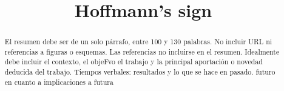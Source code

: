 \documentclass{bmcart}
\begin{document}
	\begin{frontmatter}
	
		\begin{fmbox}
			
			
			\title{Hoffmann's sign}
			
			
			\author[
			  addressref={aff1},                   %
			  corref={aff1},                       %
			  email={depablodiego@uma.es}   %
			]{ } %
			\author[
			  addressref={aff1},
			  email={alexsilva@uma.es}
			]{ }\author[
			addressref={aff1},
			email={0610948742@uma.es} 
			]{ }\author[
			addressref={aff1},
			email={martacuevas@uma.es} 
			]{ }
			
			
			\address[id=aff1]{%
			  ,             %
			  ,          %
			  ,                              %
			}
		
		\end{fmbox}%
		
		\begin{abstractbox}
		
			\begin{abstract} %
			
			El resumen debe ser de un solo párrafo, entre 100 y 130 palabras. No incluir URL ni referencias a figuras o
			esquemas. Las referencias no incluirse en el resumen. Idealmente debe incluir el contexto, el objeFvo el
			trabajo y la principal aportación o novedad deducida del trabajo. Tiempos verbales: resultados y lo que se hace
			en pasado. futuro en cuanto a implicaciones a futura
			

\end{abstract}
\end{abstractbox}
\end{frontmatter}
\end{document}
